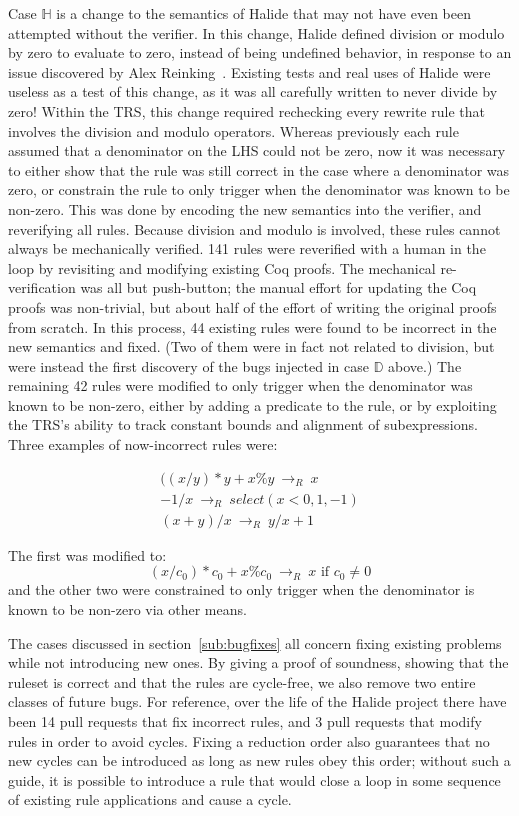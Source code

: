 \documentclass[acmsmall,review,anonymous]{acmart}\settopmatter{printfolios=true,printccs=false,printacmref=false}
\newcommand{\rewrites}[0]{\:\rightarrow_{R}\:}
\newcommand{\pred}[0]{\textrm{ if }}
\begin{document}
Case $\mathbb{H}$ is a change to the semantics of Halide that may not have even been attempted without the verifier. In this change, Halide defined division or modulo by zero to evaluate to zero, instead of being undefined behavior, in response to an issue discovered by Alex Reinking~\cite{reinkingthesis}. Existing tests and real uses of Halide were useless as a test of this change, as it was all carefully written to never divide by zero! Within the TRS, this change required rechecking every rewrite rule that involves the division and modulo operators. Whereas previously each rule assumed that a denominator on the LHS could not be zero, now it was necessary to either show that the rule was still correct in the case where a denominator was zero, or constrain the rule to only trigger when the denominator was known to be non-zero. This was done by encoding the new semantics into the verifier, and reverifying all rules. Because division and modulo is involved, these rules cannot always be mechanically verified. 141 rules were reverified with a human in the loop by revisiting and modifying existing Coq proofs. The mechanical re-verification was all but push-button; the manual effort for updating the Coq proofs was non-trivial, but about half of the effort of writing the original proofs from scratch. In this process, 44 existing rules were found to be incorrect in the new semantics and fixed. (Two of them were in fact not related to division, but were instead the first discovery of the bugs injected in case $\mathbb{D}$ above.) The remaining 42 rules were modified to only trigger when the denominator was known to be non-zero, either by adding a predicate to the rule, or by exploiting the TRS’s ability to track constant bounds and alignment of subexpressions. Three examples of now-incorrect rules were:

\begin{align*}
((x/y)*y + x\%y \rewrites x \\
  -1 / x \rewrites select(x < 0, 1, -1) \\
(x + y)/x \rewrites y/x + 1
\end{align*}

The first was modified to:
\[
(x/c_0)*c_0 + x\%c_0 \rewrites x \pred c_0 \neq 0
\]
and the other two were constrained to only trigger when the denominator is known to be non-zero via other means.

The cases discussed in section~\ref{sub:bugfixes} all concern fixing existing problems while not introducing new ones. By giving a proof of soundness, showing that the ruleset is correct and that the rules are cycle-free, we also remove two entire classes of future bugs. For reference, over the life of the Halide project there have been 14 pull requests that fix incorrect rules, and 3 pull requests that modify rules in order to avoid cycles. Fixing a reduction order also guarantees that no new cycles can be introduced as long as new rules obey this order; without such a guide, it is possible to introduce a rule that would close a loop in some sequence of existing rule applications and cause a cycle. 
\end{document}
